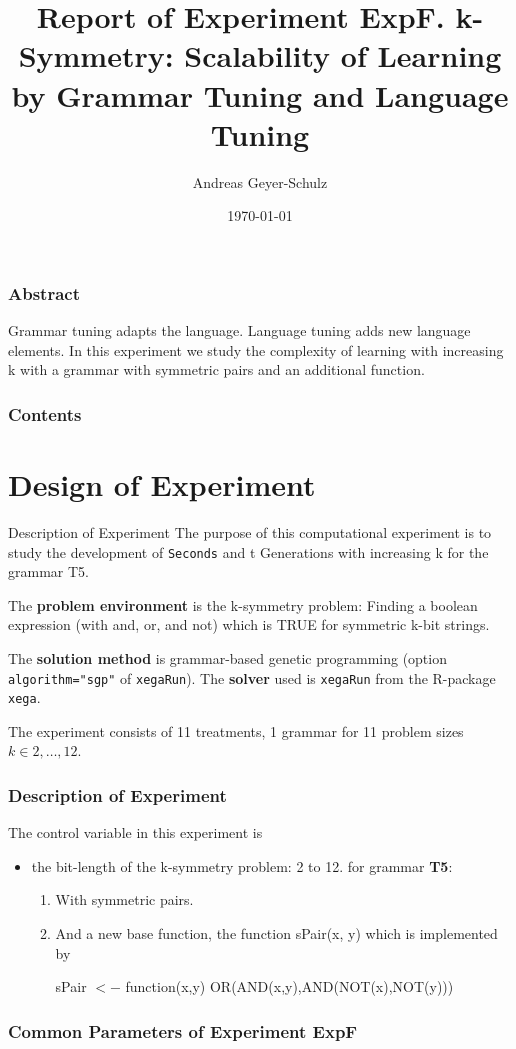 \documentclass[18pt,c]{beamer}
\makeatletter
\let\beamer@writeslidentry@miniframeson=\beamer@writeslidentry
\newcommand*{\miniframeson}{\let\beamer@writeslidentry=\beamer@writeslidentry@miniframeson}
\makeatother
\begin{document}
\title{Report of Experiment ExpF. k-Symmetry: Scalability of Learning by Grammar Tuning and Language Tuning  }
\author{Andreas Geyer-Schulz}
\date{\today}
\begin{frame}
\titlepage
\end{frame}
\begin{frame}
\frametitle{Abstract}
Grammar tuning adapts the language. Language tuning adds new language elements. In this experiment we study the complexity of learning  with increasing k with a grammar with symmetric pairs and an additional function.%
\end{frame}
\begin{frame}[t, allowframebreaks]
\frametitle{Contents}
\tableofcontents[subsubsectionstyle=hide]
\vfill
\end{frame}
\miniframeson
\section{Design of Experiment}
\begin{frame}
\vspace*{2mm}
\begin{block}{
Description of Experiment
}
The purpose of this computational experiment is to study
the development of {\tt Seconds} and {	t Generations} with increasing k
for the grammar T5.
 
The {\bf problem environment} is the k-symmetry problem: 
Finding a boolean expression (with and, or, and not)
which is TRUE for symmetric k-bit strings.
 
The {\bf solution method} is grammar-based genetic programming
(option {\tt algorithm="sgp"}  of {\tt xegaRun}).
The {\bf solver} used is {\tt xegaRun} from the R-package {\tt xega}.
 
The experiment consists of 11 treatments, 1 grammar for 11 problem sizes $k\in 2,\dots, 12$.
\end{block}
\end{frame}%
\begin{frame}
\frametitle{
Description of Experiment
}
The control variable in this experiment is
\begin{itemize}
\item the bit-length of the k-symmetry problem: 2 to 12.
       for grammar {\bf T5}:
\begin{enumerate}
\item With symmetric pairs.
\item And a new base function,
       the function sPair(x, y) which is implemented by
 
 sPair $<-$ function(x,y) {OR(AND(x,y),AND(NOT(x),NOT(y)))}
\end{enumerate}
\end{itemize}
\end{frame}%
 \begin{frame}
 \fontsize{8pt}{9pt}\selectfont
 \frametitle{ Common Parameters of Experiment ExpF }

 \label{ExpFCommonTable000.tex}  
 \end{frame}
\end{document}
